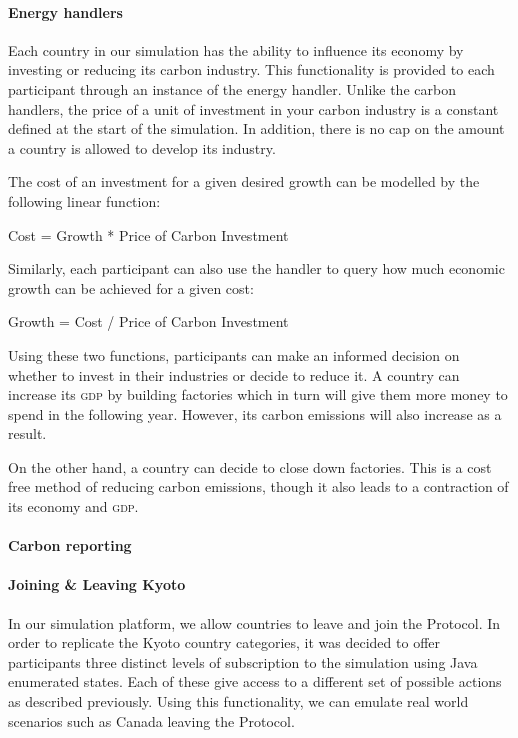 \paragraph{Energy handlers}

Each country in our simulation has the ability to influence its economy by investing or reducing its carbon industry. This functionality is provided to each participant through an instance of the energy handler. Unlike the carbon handlers, the price of a unit of investment in your carbon industry is a constant defined at the start of the simulation. In addition, there is no cap on the amount a country is allowed to develop its industry. 

The cost of an investment for a given desired growth can be modelled by the following linear function:

\begin{center}
Cost = Growth * Price of Carbon Investment
\end{center}

Similarly, each participant can also use the handler to query how much economic growth can be achieved for a given cost:

\begin{center}
Growth = Cost / Price of Carbon Investment
\end{center}

Using these two functions, participants can make an informed decision on whether to invest in their industries or decide to reduce it. A country can increase its \textsc{gdp} by building factories which in turn will give them more money to spend in the following year. However, its carbon emissions will also increase as a result.

On the other hand, a country can decide to close down factories. This is a cost free method of reducing carbon emissions, though it also leads to a contraction of its economy and \textsc{gdp}. 

\paragraph{Carbon reporting}

\paragraph{Joining \& Leaving Kyoto}

In our simulation platform, we allow countries to leave and join the Protocol. In order to replicate the Kyoto country categories, it was decided to offer participants three distinct levels of subscription to the simulation using Java enumerated states. Each of these give access to a different set of possible actions as described previously. Using this functionality, we can emulate real world scenarios such as Canada leaving the Protocol.

